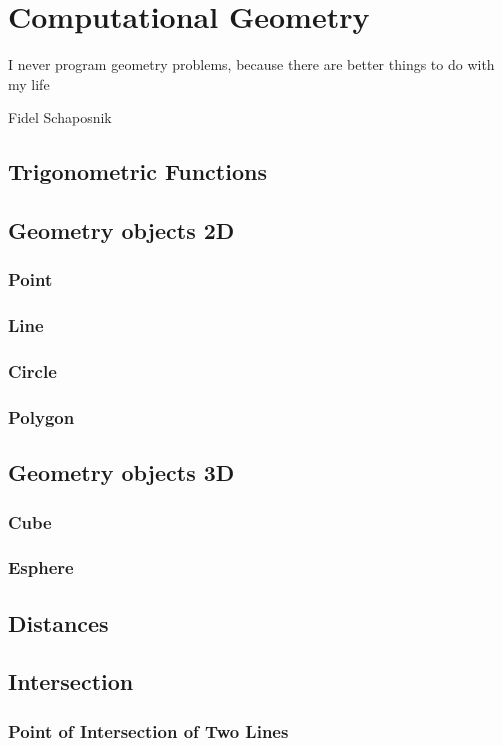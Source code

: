 \chapter{Computational Geometry}
  \epigraph{I never program geometry problems, because there are better things to do with my life}{Fidel Schaposnik}
	\section{Trigonometric Functions}
	\section{Geometry objects 2D}
		\subsection{Point}
			
		\subsection{Line}
			
		\subsection{Circle}
		\subsection{Polygon}
			
	\section{Geometry objects 3D}
		\subsection{Cube}
		\subsection{Esphere}
	\section{Distances}
	\section{Intersection}
		\subsection{Point of Intersection of Two Lines}
